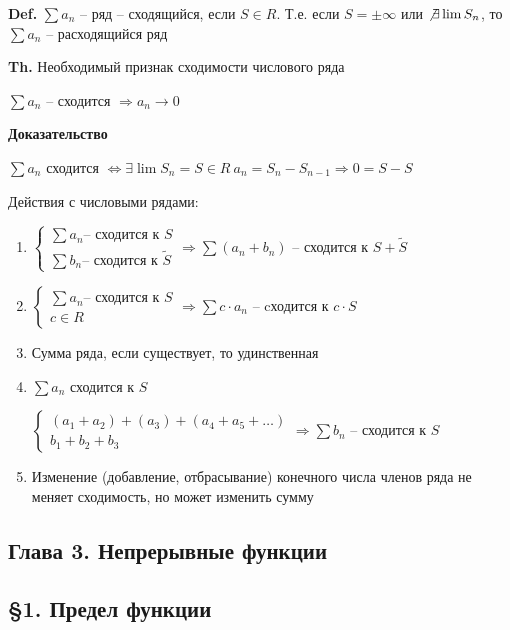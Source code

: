 \documentclass[14pt, letter paper]{article}
\begin{document}
\textbf{Def.} $\sum a_n$ -- ряд -- сходящийся, если $S \in R$. Т.е. если $S = \pm \infty$ или $\not\exists \lim{S_n}$, то $\sum a_n$ -- расходящийся ряд

\textbf{Th.} Необходимый признак сходимости числового ряда

$\sum a_n$ -- сходится $\Rightarrow a_n \rightarrow 0$

\begin{center}
    \textbf{Доказательство}
\end{center}

$\sum a_n$ сходится $\Leftrightarrow \exists \lim{S_n} = S \in R\ a_n = S_n - S_{n-1} \Rightarrow 0 = S - S$

\vspace{5mm}

Действия с числовыми рядами:

\begin{enumerate}
    \item $\begin{cases}
        \sum a_n \text{-- сходится к } S \\
        \sum b_n \text{-- сходится к } \tilde{S}
    \end{cases} \Rightarrow \sum (a_n + b_n)$ -- сходится к $S + \tilde{S}$

    \item $\begin{cases}
        \sum a_n \text{-- сходится к } S \\
        c \in R
    \end{cases} \Rightarrow \sum c \cdot a_n$ -- cходится к $c \cdot S$

    \item Сумма ряда, если существует, то удинственная

    \item $\sum a_n$ сходится к $S$

    $\begin{cases}
        (a_1 + a_2) + (a_3) + (a_4 + a_5 + \ldots) \\
        b_1 + b_2 + b_3
    \end{cases} \Rightarrow \sum b_n$ -- сходится к $S$

    \item Изменение (добавление, отбрасывание) конечного числа членов ряда не меняет сходимость, но может изменить сумму
\end{enumerate}

\begin{center}
    \section*{Глава 3. Непрерывные функции}

    \subsection*{\S 1. Предел функции}
\end{center}
\end{document}
